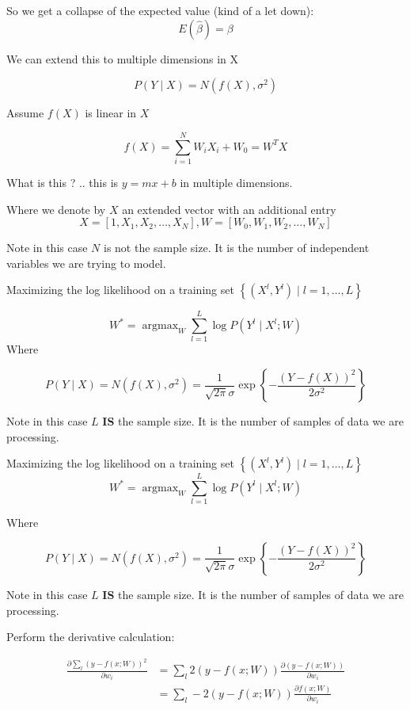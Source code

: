 \documentclass[
  12 pt,
  a4paper,
]{book}
\numberwithin{equation}{section}
\theoremstyle{plain}      %
\theoremstyle{definition} %
\theoremstyle{remark}     %
\theoremstyle{note}         %
\begin{document}
So we get a collapse of the expected value (kind of a let down): \[
E(\hat{\beta})=\beta
\]

We can extend this to multiple dimensions in X

\[
P(Y\! \mid\! X)=N\left(f(X), \sigma^{2}\right)
\]

Assume \(f(X)\) is linear in \(X\)

\[
f(X)=\sum_{i=1}^{N} W_{i} X_{i}+W_{0}=W^T X
\]

What is this ? .. this is \(y = m x + b\) in multiple dimensions.

Where we denote by \(X\) an extended vector with an additional entry \[
X=\left[1, X_{1}, X_{2}, \ldots, X_{N}\right], W=\left[W_{0}, W_{1}, W_{2}, \ldots, W_{N}\right]
\]

Note in this case \(N\) is not the sample size. It is the number of
independent variables we are trying to model.

Maximizing the log likelihood on a training set
\(\left\{\left(X^{l}, Y^{l}\right) \mid l=1, \ldots, L\right\}\)

\[
W^{*}=\operatorname{argmax}_{W} \sum_{l=1}^{L} \log P\left(Y^{l} \mid X^{l} ; W\right)
\] Where

\[
P(Y \mid X)=N\left(f(X), \sigma^{2}\right)=\frac{1}{\sqrt{2 \pi} \sigma} \exp \left\{-\frac{(Y-f(X))^{2}}{2 \sigma^{2}}\right\}
\]

Note in this case \(L\) \textbf{IS} the sample size. It is the number of
samples of data we are processing.

Maximizing the log likelihood on a training set
\(\left\{\left(X^{l}, Y^{l}\right) \mid l=1, \ldots, L\right\}\) \[
W^{*}=\operatorname{argmax}_{W} \sum_{l=1}^{L} \log P\left(Y^{l} \mid X^{l} ; W\right)
\]

Where

\[
P(Y \mid X)=N\left(f(X), \sigma^{2}\right)=\frac{1}{\sqrt{2 \pi} \sigma} \exp \left\{-\frac{(Y-f(X))^{2}}{2 \sigma^{2}}\right\}
\]

Note in this case \(L\) \textbf{IS} the sample size. It is the number of
samples of data we are processing.

Perform the derivative calculation:

\[
\begin{aligned}
\frac{\partial \sum_{l}(y-f(x ; W))^{2}}{\partial w_{i}} &=\sum_{l} 2(y-f(x ; W)) \frac{\partial(y-f(x ; W))}{\partial w_{i}} \\
&=\sum_{l}-2(y-f(x ; W)) \frac{\partial f(x ; W)}{\partial w_{i}}
\end{aligned}
\]
\end{document}
